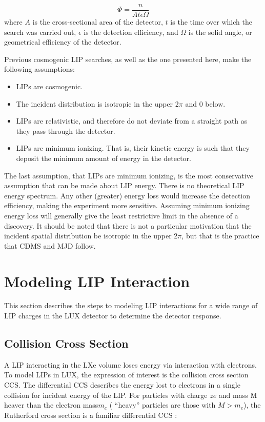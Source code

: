 \begin{equation}
\label{eq:flux}
\Phi = \frac{n}{A t \epsilon \Omega}
\end{equation}
where $A$ is the cross-sectional area of the detector, $t$ is the time over which the search was carried out, $\epsilon$ is the detection efficiency, and $\Omega$ is the solid angle, or geometrical efficiency of the detector.

Previous cosmogenic \ac{LIP} searches, as well as the one presented here, make the following assumptions:

\begin{itemize}
\item \ac{LIP}s are cosmogenic.
\item The incident distribution is isotropic in the upper 2$\pi$ and 0 below.
\item \ac{LIP}s are relativistic, and therefore do not deviate from a straight path as they pass through the detector.
\item \ac{LIP}s are minimum ionizing. That is, their kinetic energy is such that they deposit the minimum amount of energy in the detector.
\end{itemize}

The last assumption, that \ac{LIP}s are minimum ionizing, is the most conservative assumption that can be made about \ac{LIP} energy. There is no theoretical \ac{LIP} energy spectrum. Any other (greater) energy loss would increase the detection efficiency, making the experiment more sensitive. Assuming minimum ionizing energy loss will generally give the least restrictive limit in the absence of a discovery. It should be noted that there is not a particular motivation that the incident spatial distribution be isotropic in the upper 2$\pi$, but that is the practice that \ac{CDMS} and \ac{MJD} follow.


\section{Modeling LIP Interaction}
This section describes the steps to modeling \ac{LIP} interactions for a wide range of \ac{LIP} charges in the \ac{LUX} detector to determine the detector response. 

\subsection{Collision Cross Section}
A \ac{LIP} interacting in the \ac{LXe} volume loses energy via interaction with electrons.  To model \ac{LIP}s in \ac{LUX}, the expression of interest is the collision cross section \ac{CCS}. The differential \ac{CCS} describes the energy lost to electrons in a single collision for incident energy of the LIP. For particles with charge $ze$ and mass M heaver than the electron mass$ m_{e}$ ( ``heavy'' particles are those with $M > m_{e}$), the Rutherford cross section is a familiar differential \ac{CCS} \cite{PDG}:

